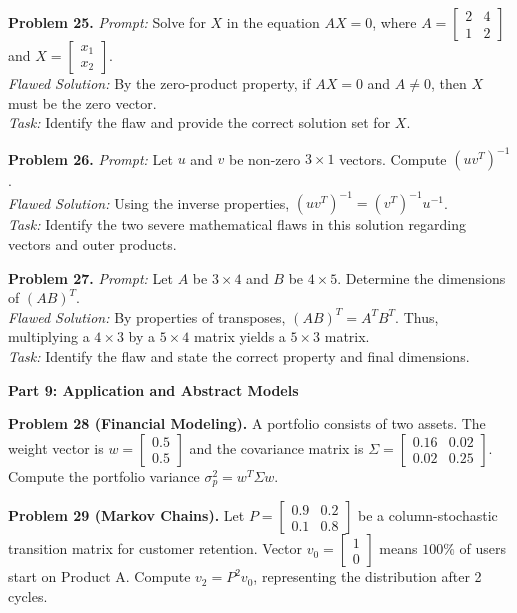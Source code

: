 \documentclass[11pt]{article}
\begin{document}
\noindent \textbf{Problem 25.} \textit{Prompt:} Solve for $X$ in the equation $AX = 0$, where $A = \begin{bmatrix} 2 & 4 \\ 1 & 2 \end{bmatrix}$ and $X = \begin{bmatrix} x_1 \\ x_2 \end{bmatrix}$.\\
\textit{Flawed Solution:} By the zero-product property, if $AX = 0$ and $A \neq 0$, then $X$ must be the zero vector.\\
\textit{Task:} Identify the flaw and provide the correct solution set for $X$.

\noindent \textbf{Problem 26.} \textit{Prompt:} Let $u$ and $v$ be non-zero $3 \times 1$ vectors. Compute $(uv^T)^{-1}$.\\
\textit{Flawed Solution:} Using the inverse properties, $(uv^T)^{-1} = (v^T)^{-1} u^{-1}$.\\
\textit{Task:} Identify the two severe mathematical flaws in this solution regarding vectors and outer products.

\noindent \textbf{Problem 27.} \textit{Prompt:} Let $A$ be $3 \times 4$ and $B$ be $4 \times 5$. Determine the dimensions of $(AB)^T$.\\
\textit{Flawed Solution:} By properties of transposes, $(AB)^T = A^T B^T$. Thus, multiplying a $4 \times 3$ by a $5 \times 4$ matrix yields a $5 \times 3$ matrix.\\
\textit{Task:} Identify the flaw and state the correct property and final dimensions.

\vspace{0.5cm}
\textbf{Part 9: Application and Abstract Models}
\vspace{0.3cm}

\noindent \textbf{Problem 28 (Financial Modeling).} A portfolio consists of two assets. The weight vector is $w = \begin{bmatrix} 0.5 \\ 0.5 \end{bmatrix}$ and the covariance matrix is $\Sigma = \begin{bmatrix} 0.16 & 0.02 \\ 0.02 & 0.25 \end{bmatrix}$. Compute the portfolio variance $\sigma_p^2 = w^T \Sigma w$.

\noindent \textbf{Problem 29 (Markov Chains).} Let $P = \begin{bmatrix} 0.9 & 0.2 \\ 0.1 & 0.8 \end{bmatrix}$ be a column-stochastic transition matrix for customer retention. Vector $v_0 = \begin{bmatrix} 1 \\ 0 \end{bmatrix}$ means $100\%$ of users start on Product A. Compute $v_2 = P^2 v_0$, representing the distribution after 2 cycles.
\end{document}
